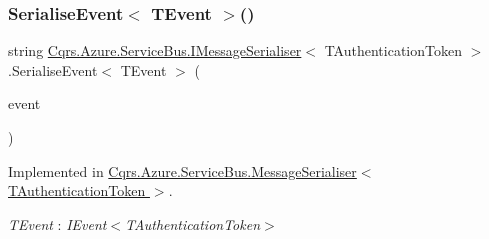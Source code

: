 \subsubsection{\texorpdfstring{Serialise\+Event$<$ T\+Event $>$()}{SerialiseEvent< TEvent >()}}
{\footnotesize\ttfamily string \hyperlink{interfaceCqrs_1_1Azure_1_1ServiceBus_1_1IMessageSerialiser}{Cqrs.\+Azure.\+Service\+Bus.\+I\+Message\+Serialiser}$<$ T\+Authentication\+Token $>$.Serialise\+Event$<$ T\+Event $>$ (\begin{DoxyParamCaption}\item[{T\+Event @}]{event }\end{DoxyParamCaption})}



Implemented in \hyperlink{classCqrs_1_1Azure_1_1ServiceBus_1_1MessageSerialiser_a596224ec927c673958e72a2153931c09}{Cqrs.\+Azure.\+Service\+Bus.\+Message\+Serialiser$<$ T\+Authentication\+Token $>$}.

\begin{Desc}
\item[Type Constraints]\begin{description}
\item[{\em T\+Event} : {\em I\+Event$<$T\+Authentication\+Token$>$}]\end{description}
\end{Desc}
